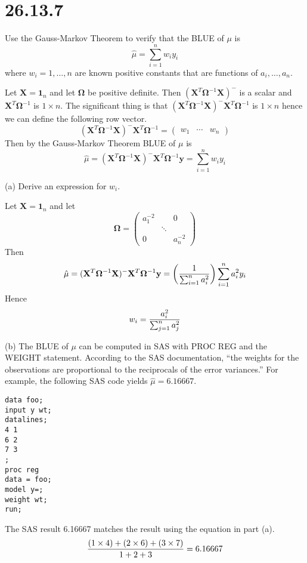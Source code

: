 \section*{26.13.7}
Use the Gauss-Markov Theorem to verify that the BLUE of $\mu$ is
\[
\hat\mu=\sum_{i=1}^nw_iy_i
\]
where $w_i=1,\ldots,n$ are known positive constants that are
functions of $a_i,\ldots,a_n$.

\bigskip
\noindent
Let $\mathbf X=\mathbf 1_n$ and let $\bm\Omega$ be positive
definite.
Then $(\mathbf X^T\bm\Omega^{-1}\mathbf X)^{-{}}$ is a scalar
and $\mathbf X^T\bm\Omega^{-1}$ is $1\times n$.
The significant thing is that
$(\mathbf X^T\bm\Omega^{-1}\mathbf X)^{-{}}\mathbf X^T\bm\Omega^{-1}$
is $1\times n$ hence we can define the following row vector.
\[
(\mathbf X^T\bm\Omega^{-1}\mathbf X)^{-{}}\mathbf X^T\bm\Omega^{-1}
=\begin{pmatrix}w_1 & \cdots & w_n\end{pmatrix}
\]
Then by the Gauss-Markov Theorem BLUE of $\mu$ is
\[
\hat\mu=
(\mathbf X^T\bm\Omega^{-1}\mathbf X)^{-{}}\mathbf X^T\bm\Omega^{-1}
\mathbf y=\sum_{i=1}^nw_iy_i
\]

\bigskip
\noindent
(a) Derive an expression for $w_i$.

\bigskip
\noindent
Let $\mathbf X=\mathbf 1_n$ and let
\[
\bm\Omega=
\begin{pmatrix}
a_1^{-2} & & 0\\
& \ddots \\
0 & & a_n^{-2}
\end{pmatrix}
\]
Then
\[
\hat\mu=
(\mathbf X^T\bm\Omega^{-1}\mathbf X)^{-{}}\mathbf X^T\bm\Omega^{-1}
\mathbf y=
\left({1\over\sum_{i=1}^na_i^2}\right)
\sum_{i=1}^na_i^2y_i
\]
Hence
\[
w_i={a_i^2\over\sum_{j=1}^na_j^2}
\]

\bigskip
\noindent
(b) The BLUE of $\mu$ can be computed in SAS with PROC REG and the
WEIGHT statement.
According to the SAS documentation, ``the weights for the
observations are proportional to the reciprocals of the
error variances.''
For example, the following SAS code yields $\hat\mu=6.16667$.
\begin{verbatim}
data foo;
input y wt;
datalines;
4 1
6 2
7 3
;
proc reg
data = foo;
model y=;
weight wt;
run;
\end{verbatim}
The SAS result 6.16667 matches the result using the equation in
part (a).
\[
{(1\times4)+(2\times6)+(3\times7)\over1+2+3}=6.16667
\]
